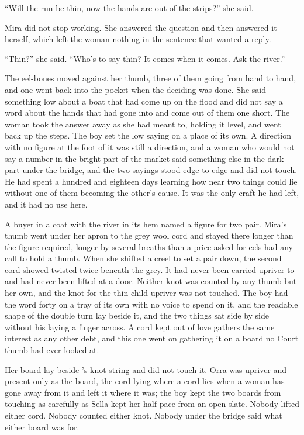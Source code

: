 “Will the run be thin, now the hands are out of the strips?” she said.

Mira did not stop working. She answered the question and then answered it herself, which left the woman nothing in the sentence that wanted a reply.

“Thin?” she said. “Who's to say thin? It comes when it comes. Ask the river.”

The eel-bones moved against her thumb, three of them going from hand to hand, and one went back into the pocket when the deciding was done. She said something low about a boat that had come up on the flood and did not say a word about the hands that had gone into  and come out of them one short. The woman took the answer away as she had meant to, holding it level, and went back up the steps. The boy set the low saying on a place of its own. A direction with no figure at the foot of it was still a direction, and a woman who would not say a number in the bright part of the market said something else in the dark part under the bridge, and the two sayings stood edge to edge and did not touch. He had spent a hundred and eighteen days learning how near two things could lie without one of them becoming the other's cause. It was the only craft he had left, and it had no use here.

A buyer in a coat with the river in its hem named a figure for two pair. Mira's thumb went under her apron to the grey wool cord and stayed there longer than the figure required, longer by several breaths than a price asked for eels had any call to hold a thumb. When she shifted a creel to set a pair down, the second cord showed twisted twice beneath the grey. It had never been carried upriver to  and had never been lifted at a door. Neither knot was counted by any thumb but her own, and the knot for the thin child upriver was not touched. The boy had the word forty on a tray of its own with no voice to spend on it, and the readable shape of the double turn lay beside it, and the two things sat side by side without his laying a finger across. A cord kept out of love gathers the same interest as any other debt, and this one went on gathering it on a board no Court thumb had ever looked at.

Her board lay beside 's knot-string and did not touch it. Orra was upriver and present only as the board, the cord lying where a cord lies when a woman has gone away from it and left it where it was; the boy kept the two boards from touching as carefully as Sella kept her half-pace from an open slate. Nobody lifted either cord. Nobody counted either knot. Nobody under the bridge said what either board was for.

